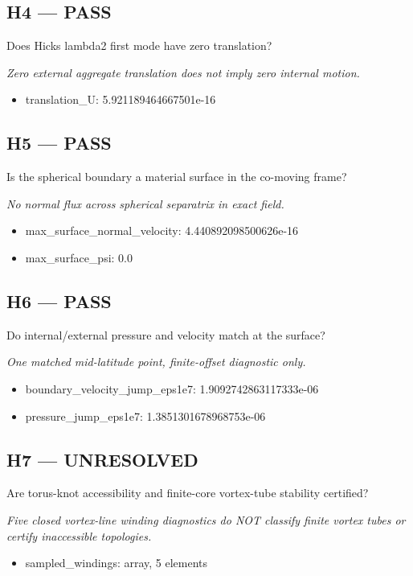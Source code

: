 \documentclass[10pt,a4paper]{article}
\begin{document}
\subsection*{H4 --- PASS}
Does Hicks lambda2 first mode have zero translation?
\par\textit{Zero external aggregate translation does not imply zero internal motion.}\par
\begin{itemize}
\item translation\_U: 5.921189464667501e-16
\end{itemize}
\subsection*{H5 --- PASS}
Is the spherical boundary a material surface in the co-moving frame?
\par\textit{No normal flux across spherical separatrix in exact field.}\par
\begin{itemize}
\item max\_surface\_normal\_velocity: 4.440892098500626e-16
\item max\_surface\_psi: 0.0
\end{itemize}
\subsection*{H6 --- PASS}
Do internal/external pressure and velocity match at the surface?
\par\textit{One matched mid-latitude point, finite-offset diagnostic only.}\par
\begin{itemize}
\item boundary\_velocity\_jump\_eps1e7: 1.9092742863117333e-06
\item pressure\_jump\_eps1e7: 1.3851301678968753e-06
\end{itemize}
\subsection*{H7 --- UNRESOLVED}
Are torus-knot accessibility and finite-core vortex-tube stability certified?
\par\textit{Five closed vortex-line winding diagnostics do NOT classify finite vortex tubes or certify inaccessible topologies.}\par
\begin{itemize}
\item sampled\_windings: array, 5 elements
\end{itemize}
\end{document}
